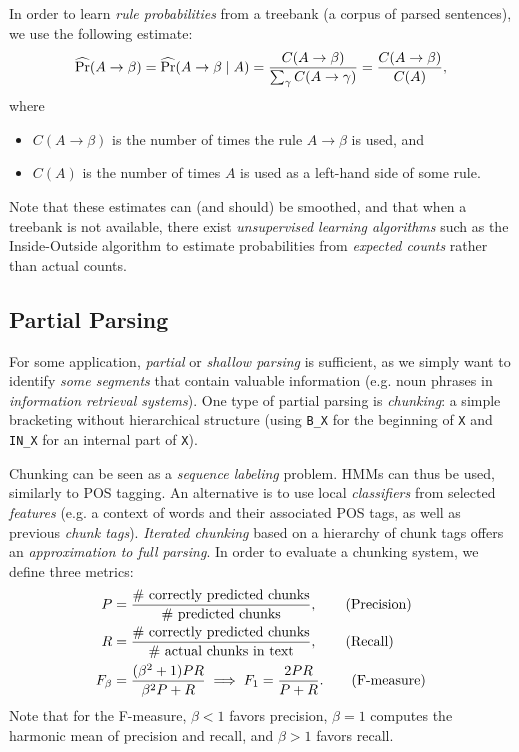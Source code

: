 In order to learn \emph{rule probabilities} from a treebank (a corpus of parsed sentences), we use the following estimate:
\[
\operatorname{\widehat{\Pr}}(A \to \beta) = \operatorname{\widehat{\Pr}}(A \to \beta \mid A) = \frac{C(A \to \beta)}{\sum_{\gamma} C(A \to \gamma)} = \frac{C(A \to \beta)}{C(A)},
\]
where
\begin{itemize}
	\item \(C(A \to \beta)\) is the number of times the rule \(A \to \beta\) is used, and
	\item \(C(A)\) is the number of times \(A\) is used as a left-hand side of some rule.
\end{itemize}
Note that these estimates can (and should) be smoothed, and that when a treebank is not available, there exist \emph{unsupervised learning algorithms} such as the Inside-Outside algorithm to estimate probabilities from \emph{expected counts} rather than actual counts.

\subsection{Partial Parsing}
For some application, \emph{partial} or \emph{shallow parsing} is sufficient, as we simply want to identify \emph{some segments} that contain valuable information (e.g. noun phrases in \emph{information retrieval systems}).
One type of partial parsing is \emph{chunking}: a simple bracketing without hierarchical structure (using \texttt{B\_X} for the beginning of \texttt{X} and \texttt{IN\_X} for an internal part of \texttt{X}).

Chunking can be seen as a \emph{sequence labeling} problem.
HMMs can thus be used, similarly to POS tagging.
An alternative is to use local \emph{classifiers} from selected \emph{features} (e.g. a context of words and their associated POS tags, as well as previous \emph{chunk tags}).
\emph{Iterated chunking} based on a hierarchy of chunk tags offers an \emph{approximation to full parsing}.
In order to evaluate a chunking system, we define three metrics:
\begin{align*}
	P &= \frac{\textnormal{\# correctly predicted chunks}}{\textnormal{\# predicted chunks}}, \tag{Precision}\\
	R &= \frac{\textnormal{\# correctly predicted chunks}}{\textnormal{\# actual chunks in text}}, \tag{Recall}\\
	F_\beta &= \frac{(\beta^2 + 1) PR}{\beta^2 P + R} \implies F_1 = \frac{2PR}{P + R}. \tag{F-measure}
\end{align*}
Note that for the F-measure, \(\beta < 1\) favors precision, \(\beta = 1\) computes the harmonic mean of precision and recall, and \(\beta > 1\) favors recall.